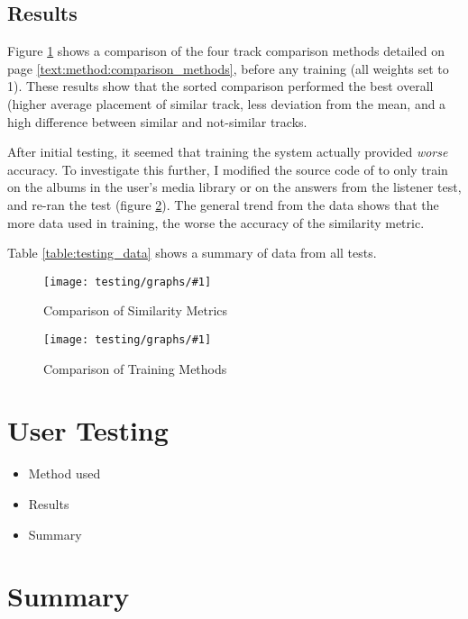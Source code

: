 \subsection{Results}
Figure \ref{graph:metric-comparison} shows a comparison of the four track comparison methods detailed on page \ref{text:method:comparison_methods}, before any training (all weights set to 1). These results show that the sorted comparison performed the best overall (higher average placement of similar track, less deviation from the mean, and a high difference between similar and not-similar tracks.

After initial testing, it seemed that training the system actually provided \emph{worse} accuracy. To investigate this further, I modified the source code of  to only train on the albums in the user's media library or on the answers from the listener test, and re-ran the test (figure \ref{graph:training-method-comparison}). The general trend from the data shows that the more data used in training, the worse the accuracy of the similarity metric.
 
Table \ref{table:testing_data} shows a summary of data from all tests.

\newcommand{\graph}[2]{
\begin{figure}[hp]
	\caption{#2}
	\texttt{[image: testing/graphs/\#1]}
	\label{graph:#1}
\end{figure}}
\graph{metric-comparison}{Comparison of Similarity Metrics}
\graph{training-method-comparison}{Comparison of Training Methods}
\pagebreak
\section{User Testing}
\begin{itemize}
	\item Method used
	\item Results
	\item Summary
\end{itemize}
\section{Summary}

